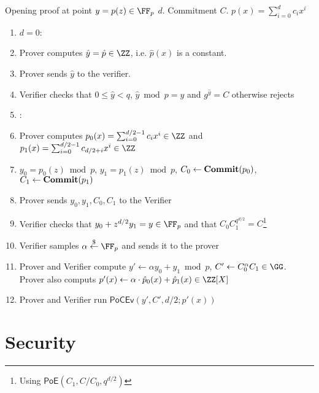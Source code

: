 \documentclass{article}
\begin{document}
\begin{small}
 \begin{minipage}{1.1\textwidth}
\begin{mdframed}[userdefinedwidth=1\textwidth]  \label{prot:Opening}

Opening proof at point $y=p(z)\in \FF_p$ $d$. Commitment $C$. $p(x)=\sum_{i=0}^{d} c_i x^{i}$
\begin{enumerate}[nolistsep]
\item \pcif $d=0$:
\item \pcind[1] Prover computes $\hat{y}=\hat{p} \in \ZZ$, i.e. $\hat{p}(x)$ is a constant. 
\item \pcind[1] Prover sends $\hat{y}$ to the verifier.
\item \pcind[1] Verifier checks that $0\leq\hat{y}< q$,  $\hat{y} \bmod p=y$ and $g^{\hat{y}}=C$ otherwise rejects
\item \pcelse:
\item \pcind[1] Prover computes $p_0(x)=\sum_{i=0}^{d/2-1} c_i x^i\in \ZZ$ and $p_1(x)=\sum_{i=0}^{d/2-1} c_{d/2+i} x^{i}\in \ZZ$
\item \pcind[1] $y_0=p_0(z) \bmod p$, $y_1=p_1(z)\bmod p$, $C_0\gets\textbf{{Commit}}(p_0)$,$C_1\gets\textbf{{Commit}}(p_1)$
\item \pcind[1] Prover sends $y_0,y_1,C_0,C_1$ to the Verifier
\item \pcind[1] Verifier checks that $y_0+z^{d/2} y_1=y\in \FF_p$ and that $C_0C_1^{q^{d/2}}=C$\footnote{Using $\textsf{PoE}(C_1,C/C_0,q^{d/2})$}
\item \pcind[1] Verifier samples $\alpha \sample \FF_p$ and sends it to the prover
\item \pcind[1] Prover and Verifier compute $y'\gets\alpha y_0 +y_1 \bmod p$, $C'\gets C_0^{\alpha}C_1 \in \GG$. \\Prover also computs $p'(x)\gets\alpha  \cdot \hat{p}_0(x)+\hat{p}_1(x) \in \ZZ[X]$ 
\item \pcind[1] Prover and Verifier run $\textsf{PoCEv}(y',C',d/2;p'(x))$
\end{enumerate}
\end{mdframed}
\end{minipage}
\end{small}

\section{Security}
\end{document}
